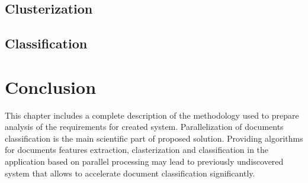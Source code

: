 \subsection{Clusterization}

\subsection{Classification}

\section{Conclusion}
This chapter includes a complete description of the methodology used to prepare analysis of the requirements for created system. Parallelization of documents classification is the main scientific part of proposed solution. Providing algorithms for documents features extraction, clasterization and classification in the application based on parallel processing may lead to previously undiscovered system that allows to accelerate document classification significantly. 
